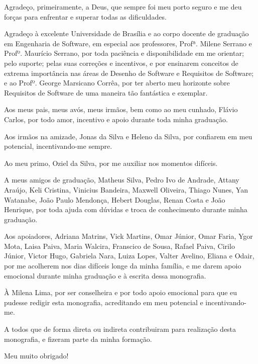 \begin{agradecimentos}

	Agradeço, primeiramente, a Deus, que sempre foi meu porto seguro e me deu forças para enfrentar e superar todas as dificuldades.
	 
	Agradeço à excelente Universidade de Brasília e ao corpo docente de graduação em Engenharia de Software, em especial aos professores, Profª. Milene Serrano e Profº. Maurício Serrano, por toda paciência e disponibilidade em me orientar; pelo suporte; pelas suas correções e incentivos, e por ensinarem conceitos de extrema importância nas áreas de Desenho de Software e Requisitos de Software; e ao Profº. George Marsicano Corrêa, por ter aberto meu horizonte sobre Requisitos de Software de uma maneira tão fantástica e exemplar.
	
	Aos meus pais, meus avós, meus irmãos, bem como ao meu cunhado, Flávio Carlos, por todo amor, incentivo e apoio durante toda minha graduação. 
	
	Aos irmãos na amizade, Jonas da Silva e Heleno da Silva, por confiarem em meu potencial, incentivando-me sempre. 
	
	Ao meu primo, Oziel da Silva, por me auxiliar nos momentos difíceis. 
	
	A meus amigos de graduação, Matheus Silva, Pedro Ivo de Andrade, Attany Araújo, Keli Cristina, Vinicius Bandeira, Maxwell Oliveira, Thiago Nunes, Yan Watanabe, João Paulo Mendonça, Hebert Douglas, Renan Costa e João Henrique, por toda ajuda com dúvidas e troca de conhecimento durante minha graduação. 
	
	Aos apoiadores, Adriana Matrins, Vick Martins, Omar Júnior, Omar Faria, Ygor Mota, Laisa Paiva, Maria Walcira, Franscico de Sousa, Rafael Paiva, Cirilo Júnior, Victor Hugo, Gabriela Nara, Luiza Lopes, Valter Avelino, Eliana e Odair,  por me acolherem nos dias difíceis longe da minha família,  e me darem apoio emocional durante minha graduação e à escrita dessa monografia. 
	
	À Milena Lima, por ser conselheira e por todo apoio emocional para que eu pudesse redigir esta monografia, acreditando em meu potencial e incentivando-me.
	
	A todos que de forma direta ou indireta contribuiram para realização desta monografia, e fizeram parte da minha formação. 
	
	Meu muito obrigado!  
	
\end{agradecimentos}
